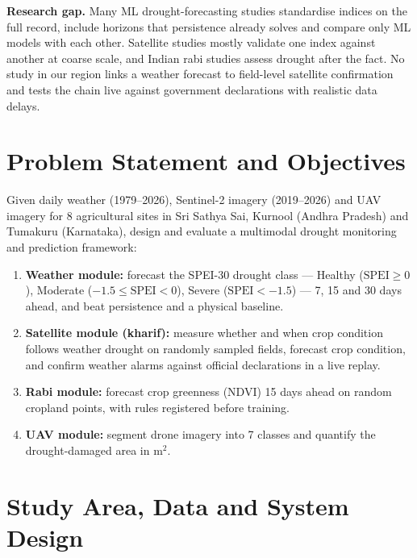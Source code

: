 \documentclass[11pt,a4paper,oneside]{article}
\begin{document}
\textbf{Research gap.} Many ML drought-forecasting studies standardise indices on the full record, include horizons that persistence already solves and compare only ML models with each other. Satellite studies mostly validate one index against another at coarse scale, and Indian rabi studies assess drought after the fact. No study in our region links a weather forecast to field-level satellite confirmation and tests the chain live against government declarations with realistic data delays.

\section{Problem Statement and Objectives}

Given daily weather (1979--2026), Sentinel-2 imagery (2019--2026) and UAV imagery for 8 agricultural sites in Sri Sathya Sai, Kurnool (Andhra Pradesh) and Tumakuru (Karnataka), design and evaluate a multimodal drought monitoring and prediction framework:
\begin{enumerate}
\item \textbf{Weather module:} forecast the SPEI-30 drought class --- Healthy ($\text{SPEI} \ge 0$), Moderate ($-1.5 \le \text{SPEI} < 0$), Severe ($\text{SPEI} < -1.5$) --- 7, 15 and 30 days ahead, and beat persistence and a physical baseline.
\item \textbf{Satellite module (kharif):} measure whether and when crop condition follows weather drought on randomly sampled fields, forecast crop condition, and confirm weather alarms against official declarations in a live replay.
\item \textbf{Rabi module:} forecast crop greenness (NDVI) 15 days ahead on random cropland points, with rules registered before training.
\item \textbf{UAV module:} segment drone imagery into 7 classes and quantify the drought-damaged area in m$^2$.
\end{enumerate}

\section{Study Area, Data and System Design}
\end{document}
